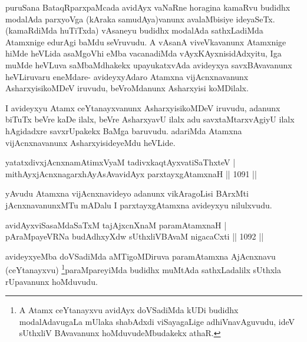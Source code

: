 \begin{artha}
puruSana BataqRparxpaMcada avidAyx vaNaRne horagina kamaRvu budidhx modalAda parxyoVga (kAraka samudAya)vanunx avalaMbisiye ideyaSeTx. (kamaRdiMda huTiTxda) vAsaneyu budidhx modalAda sathxLadiMda Atamxnige edurAgi baMdu seVruvudu. A vAsanA viveVkavanunx Atamxnige hiMde heVLida asaMgoVhi eMba vacanadiMda vAyxKAyxnisidAdxyitu, Iga muMde heVLuva saMbaMdhakekx upayukatxvAda avideyxya savxBAvavanunx heVLiruvaru eneMdare- avideyxyAdaro Atamxna vijAcnxnavanunx AsharxyisikoMDeV iruvudu, beVroMdanunx Asharxyisi koMDilalx.
\end{artha}

\begin{artha}
I avideyxyu Atamx ceYtanayxvanunx AsharxyisikoMDeV iruvudu, adanunx biTuTx beVre kaDe ilalx, beVre AsharxyavU ilalx adu savxtaMtarxvAgiyU ilalx hAgidadxre savxrUpakekx BaMga baruvudu. adariMda Atamxna vijAcnxnavanunx AsharxyisideyeMdu heVLide.
\end{artha}



\begin{shl}
yatatxdivxjAcnxnamAtimxVyaM \footnotemark[1]tadivxkaqtAyxvatiSaThxteV | \\
mithAyxjAcnxnagarxhAyAsAvavidAyx parxtayxgAtamxnaH \hfill||  1091 || 
\end{shl}

\begin{artha}
yAvudu Atamxna vijAcnxnavideyo adanunx vikAragoLisi BArxMti jAcnxnavanunxMTu mADalu I parxtayxgAtamxna avideyxyu nilulxvudu.
\end{artha}


\begin{shl}
avidAyxviSasaMdaSaTxM tajAjxcnXnaM paramAtamxnaH | \\
pAraMpayeVRNa budAdhxyXdw sUthxliVBAvaM nigacaCxti \hfill||  1092 ||  
\end{shl}

\begin{artha}
avideyxyeMba doVSadiMda aMTigoMDiruva paramAtamxna AjAcnxnavu (ceYtanayxvu) \footnote[1]{A Atamx ceYtanayxvu avidAyx doVSadiMda kUDi budidhx modalAdavugaLa mUlaka shabAdxdi viSayagaLige adhiVnavAguvudu, ideV sUthxliV BAvavanunx hoMduvudeMbudakekx athaR.}paraMpareyiMda budidhx muMtAda sathxLadalilx sUthxla rUpavanunx hoMduvudu.
\end{artha}

